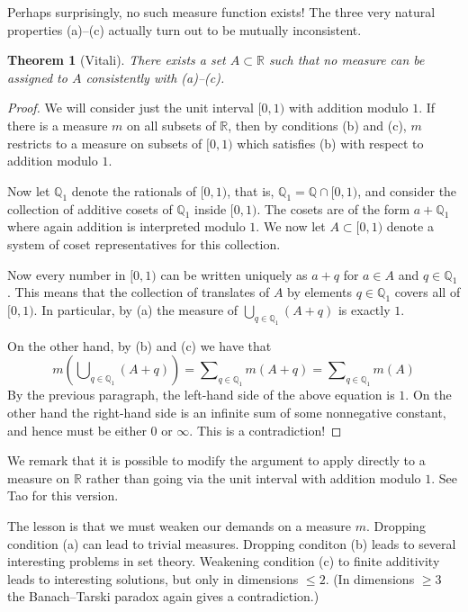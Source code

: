 \documentclass[11pt,oneside]{amsbook}
\newcommand{\QQ}{{\mathbb Q}}
\newcommand{\RR}{{\mathbb R}}
\theoremstyle{definition}
\theoremstyle{plain}
\newtheorem{thm}{Theorem}[section]
\theoremstyle{definition}
\theoremstyle{remark}
\numberwithin{equation}{section}
\numberwithin{figure}{section}
\begin{document}
Perhaps surprisingly, no such measure function exists! The three very natural properties (a)--(c) actually turn out to be mutually inconsistent.

\begin{thm}[Vitali]
  There exists a set $A\subset\RR$ such that no measure can be assigned to $A$ consistently with (a)--(c).
\end{thm}

\begin{proof}
  We will consider just the unit interval $[0,1)$ with addition modulo $1$. If there is a measure $m$ on all subsets of $\RR$, then by conditions (b) and (c), $m$ restricts to a measure on subsets of $[0,1)$ which satisfies (b) with respect to addition modulo $1$.

  Now let $\QQ_1$ denote the rationals of $[0,1)$, that is, $\QQ_1=\QQ\cap[0,1)$, and consider the collection of additive cosets of $\QQ_1$ inside $[0,1)$. The cosets are of the form $a+\QQ_1$ where again addition is interpreted modulo $1$. We now let $A\subset[0,1)$ denote a system of coset representatives for this collection.

  Now every number in $[0,1)$ can be written uniquely as $a+q$ for $a\in A$ and $q\in\QQ_1$. This means that the collection of translates of $A$ by elements $q\in\QQ_1$ covers all of $[0,1)$. In particular, by (a) the measure of $\bigcup_{q\in\QQ_1}(A+q)$ is exactly $1$.

  On the other hand, by (b) and (c) we have that
  \[m\left(\bigcup\nolimits_{q\in\QQ_1}(A+q)\right)
  =\sum\nolimits_{q\in\QQ_1}m(A+q)=\sum\nolimits_{q\in\QQ_1}m(A)
  \]
  By the previous paragraph, the left-hand side of the above equation is $1$. On the other hand the right-hand side is an infinite sum of some nonnegative constant, and hence must be either $0$ or $\infty$. This is a contradiction!
\end{proof}

We remark that it is possible to modify the argument to apply directly to a measure on $\RR$ rather than going via the unit interval with addition modulo $1$. See Tao for this version.

The lesson is that we must weaken our demands on a measure $m$. Dropping condition (a) can lead to trivial measures. Dropping conditon (b) leads to several interesting problems in set theory. Weakening condition (c) to finite additivity leads to interesting solutions, but only in dimensions $\leq2$. (In dimensions $\geq3$ the Banach--Tarski paradox again gives a contradiction.)
\end{document}
